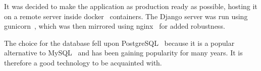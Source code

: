 It was decided to make the application as production ready as possible,
hosting it on a remote server inside docker~\cite{docker} containers. The
Django server was run using gunicorn~\cite{gunicorn}, which was then
mirrored using nginx~\cite{nginx} for added robustness.

The choice for the database fell upon PostgreSQL~\cite{postgres} because it
is a popular alternative to MySQL~\cite{MySQL} and has been gaining popularity
for many years. It is therefore a good technology to be acquainted with.
